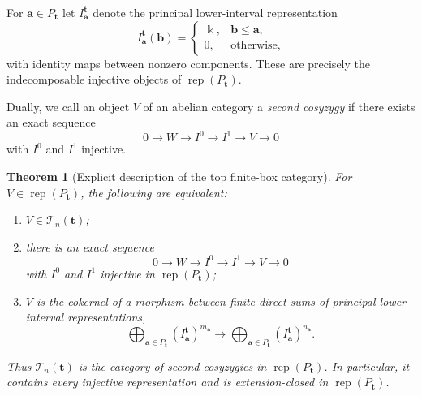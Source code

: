 \documentclass[12pt,reqno]{amsart}
\newtheorem{theorem}{Theorem}[section]
\theoremstyle{definition}
\theoremstyle{remark}
\newcommand{\Rep}{\operatorname{rep}}
\begin{document}
For $\mathbf a\in P_{\mathbf t}$ let $I^{\mathbf t}_{\mathbf a}$ denote the principal lower-interval representation
\[
I^{\mathbf t}_{\mathbf a}(\mathbf b)=
\begin{cases}
\Bbbk,&\mathbf b\le\mathbf a,\\
0,&\text{otherwise},
\end{cases}
\]
with identity maps between nonzero components.  These are precisely the indecomposable injective objects of $\Rep(P_{\mathbf t})$.

Dually, we call an object $V$ of an abelian category a \emph{second cosyzygy}
if there exists an exact sequence
$$
0\longrightarrow W\longrightarrow I^0\longrightarrow I^1
\longrightarrow V\longrightarrow0
$$
with $I^0$ and $I^1$ injective.

\begin{theorem}[Explicit description of the top finite-box category]\label{thm:top-finite}
For $V\in\Rep(P_{\mathbf t})$, the following are equivalent:
\begin{enumerate}[label=\rm(\arabic*)]
\item $V\in\mathcal T_n(\mathbf t)$;
\item there is an exact sequence
\[
0\longrightarrow W\longrightarrow I^0\longrightarrow I^1\longrightarrow V\longrightarrow0
\]
with $I^0$ and $I^1$ injective in $\Rep(P_{\mathbf t})$;
\item $V$ is the cokernel of a morphism between finite direct sums of principal lower-interval representations,
\[
\bigoplus_{\mathbf a\in P_{\mathbf t}}
   (I^{\mathbf t}_{\mathbf a})^{m_{\mathbf a}}
\longrightarrow
\bigoplus_{\mathbf a\in P_{\mathbf t}}
   (I^{\mathbf t}_{\mathbf a})^{n_{\mathbf a}}.
\]
\end{enumerate}
Thus $\mathcal T_n(\mathbf t)$ is the category of second cosyzygies in $\Rep(P_{\mathbf t})$.  In particular, it contains every injective representation and is extension-closed in $\Rep(P_{\mathbf t})$.
\end{theorem}
\end{document}
